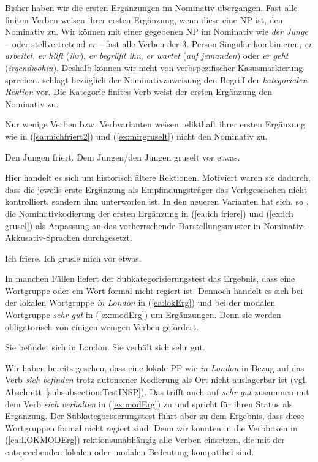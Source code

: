 Bisher haben wir die ersten Ergänzungen im Nominativ übergangen. Fast alle finiten Verben weisen ihrer ersten Ergänzung, wenn diese eine NP ist, den Nominativ zu. Wir können mit einer gegebenen NP im Nominativ wie \textit{der Junge} -- oder stellvertretend \textit{er} -- fast alle Verben der 3. Person Singular kombinieren, \zB \textit{er arbeitet}, \textit{er hilft} (\textit{ihr}), \textit{er begrüßt ihn}, \textit{er wartet} (\textit{auf jemanden}) oder \textit{er geht} (\textit{irgendwohin}). Deshalb können wir nicht von verbspezifischer Kasusmarkierung sprechen. \citet[37]{Eisenberg2020_Satz} schlägt bezüglich der Nominativzuweisung den Begriff der \textit{kategorialen Rektion} vor. Die Kategorie finites Verb weist der ersten Ergänzung den Nominativ zu. 

Nur wenige Verben bzw. Verbvarianten weisen relikthaft ihrer ersten Ergänzung wie in (\ref{ea:michfriert2}) und (\ref{ex:mirgruselt}) nicht den Nominativ zu. 

\ea 
\ea \label{ea:michfriert2} Den Jungen friert.
\ex \label{ex:mirgruselt} Dem Jungen/den Jungen gruselt vor etwas.
\z 
\z 

Hier handelt es sich um historisch ältere Rektionen. Motiviert waren sie dadurch, dass die jeweils erste Ergänzung als Empfindungsträger das Verbgeschehen nicht kontrolliert, sondern ihm unterworfen ist. In den neueren Varianten hat sich, so \citet[110]{Bossong1992}, die Nominativkodierung der ersten Ergänzung in (\ref{ea:ich friere}) und (\ref{ex:ich grusel}) als Anpassung an das vorherrschende Darstellungsmuster in Nominativ-Akkusativ-Sprachen durchgesetzt. 

\ea 
\ea \label{ea:ich friere} Ich friere.
\ex \label{ex:ich grusel} Ich grusle mich vor etwas.
\z 
\z

In manchen Fällen liefert der Subkategorisierungstest das Ergebnis, dass eine Wortgruppe oder ein Wort formal nicht regiert ist. Dennoch handelt es sich bei der lokalen Wortgruppe \textit{in London} in (\ref{ea:lokErg}) und bei der modalen Wortgruppe \textit{sehr gut} in (\ref{ex:modErg}) um Ergänzungen. Denn sie werden obligatorisch von einigen wenigen Verben gefordert.  

\ea 
\ea \label{ea:lokErg} Sie befindet sich in London.
\ex \label{ex:modErg} Sie verhält sich sehr gut.
\z 
\z 

Wir haben bereits gesehen, dass eine lokale PP wie \textit{in London} in Bezug auf das Verb \textit{sich befinden} trotz autonomer Kodierung als Ort nicht auslagerbar ist (vgl. Abschnitt~\ref{subsubsection:TestINSP}). Das trifft auch auf \textit{sehr gut} zusammen mit dem Verb \textit{sich verhalten} in (\ref{ex:modErg}) zu und spricht für ihren Status als Ergänzung. Der Subkategorisierungstest führt aber zu dem Ergebnis, dass diese Wortgruppen formal nicht regiert sind. Denn wir könnten in die Verbboxen in (\ref{ea:LOKMODErg}) rektionsunabhängig alle Verben einsetzen, die mit der entsprechenden lokalen oder modalen Bedeutung kompatibel sind. 

